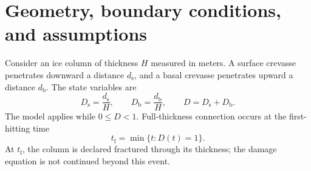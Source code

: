 \documentclass[11pt]{article}
\newcommand{\rms}{\mathrm{s}}
\newcommand{\rmb}{\mathrm{b}}
\begin{document}
\section{Geometry, boundary conditions, and assumptions}

Consider an ice column of thickness \(H\) measured in meters.  A surface
crevasse penetrates downward a distance \(d_{\rms}\), and a basal crevasse
penetrates upward a distance \(d_{\rmb}\).  The state variables are
\begin{equation}
 D_{\rms}=\frac{d_{\rms}}{H},\qquad
 D_{\rmb}=\frac{d_{\rmb}}{H},\qquad
 D=D_{\rms}+D_{\rmb}.
 \label{eq:damage}
\end{equation}
The model applies while \(0\leq D<1\).  Full-thickness connection occurs at
the first-hitting time
\begin{equation}
 t_{\mathrm{f}}=\min\{t:D(t)=1\}.
 \label{eq:failure-time}
\end{equation}
At \(t_{\mathrm{f}}\), the column is declared fractured through its thickness;
the damage equation is not continued beyond this event.
\end{document}
